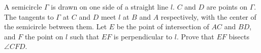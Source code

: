 A semicircle $\Gamma$ is drawn on one side of a straight line $l$. $C$ and $D$ are points on $\Gamma$. The tangents to $\Gamma$ at $C$ and $D$ meet $l$ at $B$ and $A$ respectively, with the center of the semicircle between them. Let $E$ be the point of intersection of $AC$ and $BD$, and $F$ the point on $l$ such that $EF$ is perpendicular to $l$. Prove that $EF$ bisects $\angle CFD$.

